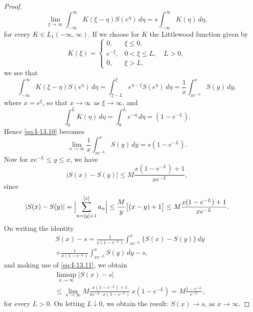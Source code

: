 \begin{proof}
\begin{equation}
\lim_{\xi\to\infty}\int_{-\infty}^{\infty}K(\xi-\eta)S(e^\eta)\,d\eta
=s\int_{-\infty}^{\infty}K(\eta)\,d\eta,
\end{equation}
for every $K\in L_1(-\infty,\infty)$. If we choose for $K$ the Littlewood function given by
\begin{equation*}
K(\xi)=
\begin{cases}
0,&\xi\le 0,\\
e^{-\xi},&0<\xi\le L,\quad L>0,\\
0,&\xi>L,
\end{cases}
\end{equation*}
we see that
\begin{equation*}
\int_{-\infty}^{\infty}K(\xi-\eta)S(e^\eta)\,d\eta
=\int_{\xi-L}^{\xi}e^{\eta-\xi}S(e^\eta)\,d\eta
=\frac{1}{x}\int_{xe^{-L}}^{x}S(y)\,dy,
\end{equation*}
where $x=e^\xi$, so that $x\to\infty$ as $\xi\to\infty$, and
\begin{equation*}
\int_{0}^{L}K(\eta)\,d\eta=\int_{0}^{L}e^{-\eta}\,d\eta=(1-e^{-L}).
\end{equation*}
Hence \eqref{eq:I-13.10} becomes
\begin{equation}\label{eq:I-13.11}\tag{13.11}
\lim_{x\to\infty}\frac{1}{x}\int_{xe^{-L}}^{x}S(y)\,dy=s(1-e^{-L}).
\end{equation}
Now for $xe^{-L}\le y\le x$, we have
\begin{equation*}
|S(x)-S(y)|\le M\frac{x(1-e^{-L})+1}{xe^{-L}},
\end{equation*}
since
\begin{equation*}
|S(x)-S(y)|
=\Bigl|\sum_{n=[y]+1}^{[x]}a_n\Bigr|
\le\frac{M}{y}\bigl[(x-y)+1\bigr]
\le M\frac{x(1-e^{-L})+1}{xe^{-L}}.
\end{equation*}
On writing the identity
\begin{equation*}
\begin{aligned}
&S(x) - s = \frac{1}{x(1-e^{-L})}  \int_{xe^{-L}}^{x}\{S(x) - S(y)\}\,dy\\
&+ \frac{1}{x(1-e^{-L})}  \int_{xe^{-L}}^{x}S(y)\,dy - s,
\end{aligned}
\end{equation*}
and making use of \eqref{eq:I-13.11}, we obtain
\begin{equation*}
\begin{aligned}
&\limsup_{x\to\infty}|S(x) - s|\\
&\le \lim_{x\to\infty}M\frac{x(1-e^{-L})+1}{xe^{-L}\cdot x(1-e^{-L})}\,x(1-e^{-L}) = M\frac{1-e^{-L}}{e^{-L}},
\end{aligned}
\end{equation*}
for every $L>0$. On letting $L\downarrow 0$, we obtain the result: $S(x)\to s$, as $x\to\infty$.
\end{proof}

